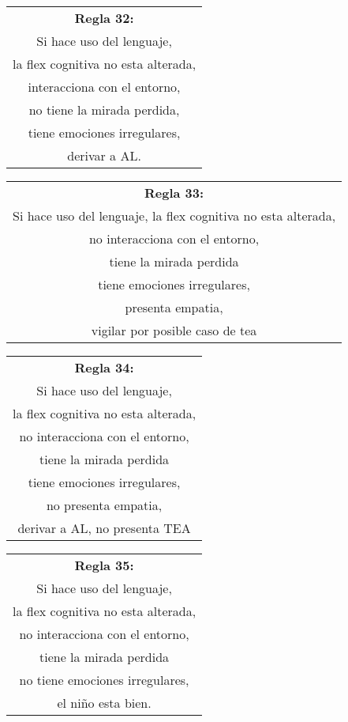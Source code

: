 \documentclass[letterpaper,12pt]{article}
\begin{document}
\begin{center}
	\begin{tabular}{|c|}
		\hline 
		\textbf{Regla 32:} \\
Si hace uso del lenguaje,\\
la flex cognitiva no esta alterada,\\
interacciona con el entorno,\\
no tiene la mirada perdida,\\
tiene emociones irregulares,\\
derivar a AL.\\
\hline 
\end{tabular} 
\end{center}
	
\begin{center}
	\begin{tabular}{|c|}
		\hline 
		\textbf{Regla 33:} \\
Si hace uso del lenguaje,
la flex cognitiva no esta alterada,\\
no interacciona con el entorno,\\
tiene la mirada perdida\\
tiene emociones irregulares,\\
presenta empatia,\\
vigilar por posible caso de tea\\
\hline 
\end{tabular} 
\end{center}

\begin{center}
	\begin{tabular}{|c|}
		\hline 
		\textbf{Regla 34:} \\
		Si hace uso del lenguaje,\\
		la flex cognitiva no esta alterada,\\
		no interacciona con el entorno,\\
		tiene la mirada perdida\\
		tiene emociones irregulares,\\
		no presenta empatia,\\
		derivar a AL, no presenta TEA\\
\hline 
\end{tabular} 
\end{center}
		
\begin{center}
	\begin{tabular}{|c|}
		\hline 
		\textbf{Regla 35:} \\
		Si hace uso del lenguaje,\\
		la flex cognitiva no esta alterada,\\
		no interacciona con el entorno,\\
		tiene la mirada perdida\\
		no tiene emociones irregulares,\\
		el niño esta bien.\\
\hline 
\end{tabular} 
\end{center}
		
\end{document}
